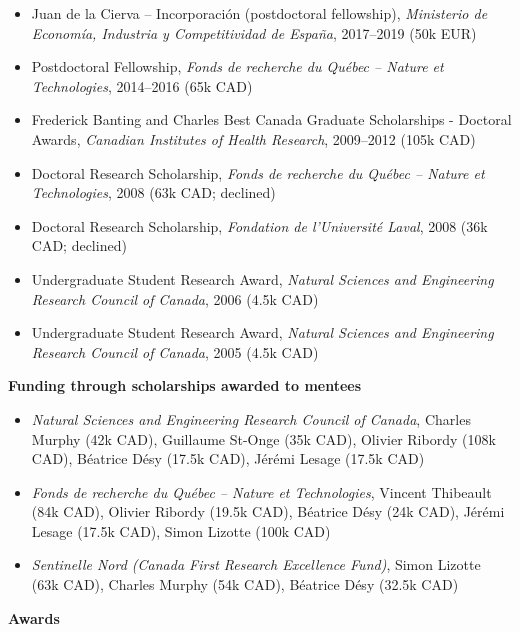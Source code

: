 \documentclass[11pt]{article}
\begin{document}
\begin{itemize}
  \item Juan de la Cierva -- Incorporaci\'on (postdoctoral fellowship), \textit{Ministerio de Econom\'ia, Industria y Competitividad de Espa\~{n}a}, 2017--2019 (50k EUR)
  \item Postdoctoral Fellowship, \textit{Fonds de recherche du Qu\'ebec -- Nature et Technologies}, 2014--2016 (65k CAD)
  \item Frederick Banting and Charles Best Canada Graduate Scholarships - Doctoral Awards, \textit{Canadian Institutes of Health Research}, 2009--2012 (105k CAD)
  \item Doctoral Research Scholarship, \textit{Fonds de recherche du Qu\'ebec -- Nature et Technologies}, 2008 (63k CAD; declined)
  \item Doctoral Research Scholarship, \textit{Fondation de l'Universit\'e Laval}, 2008 (36k CAD; declined)
  \item Undergraduate Student Research Award, \textit{Natural Sciences and Engineering Research Council of Canada}, 2006 (4.5k CAD)
  \item Undergraduate Student Research Award, \textit{Natural Sciences and Engineering Research Council of Canada}, 2005 (4.5k CAD)
\end{itemize}
%
%
%
\textbf{Funding through scholarships awarded to mentees}
%
\begin{itemize}
  \item \textit{Natural Sciences and Engineering Research Council of Canada}, Charles Murphy (42k CAD), Guillaume St-Onge (35k CAD), Olivier Ribordy (108k CAD), Béatrice Désy (17.5k CAD), Jérémi Lesage (17.5k CAD)
  \item \textit{Fonds de recherche du Qu\'ebec -- Nature et Technologies}, Vincent Thibeault (84k CAD), Olivier Ribordy (19.5k CAD), Béatrice Désy (24k CAD), Jérémi Lesage (17.5k CAD), Simon Lizotte (100k CAD)
  \item \textit{Sentinelle Nord (Canada First Research Excellence Fund)}, Simon Lizotte (63k CAD), Charles Murphy (54k CAD), Béatrice Désy (32.5k CAD)
\end{itemize}
%
%
%
\textbf{Awards}
%
\end{document}
